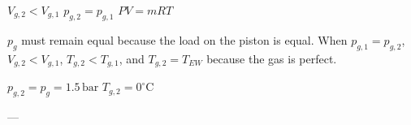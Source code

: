 \( V_{g,2} < V_{g,1} \)  
\( p_{g,2} = p_{g,1} \)  
\( PV = mRT \)  

\( p_{g} \) must remain equal because the load on the piston is equal. When \( p_{g,1} = p_{g,2} \), \( V_{g,2} < V_{g,1} \), \( T_{g,2} < T_{g,1} \), and \( T_{g,2} = T_{EW} \) because the gas is perfect.  

\( p_{g,2} = p_{g} = 1.5 \, \text{bar} \)  
\( T_{g,2} = 0^\circ \text{C} \)  

---